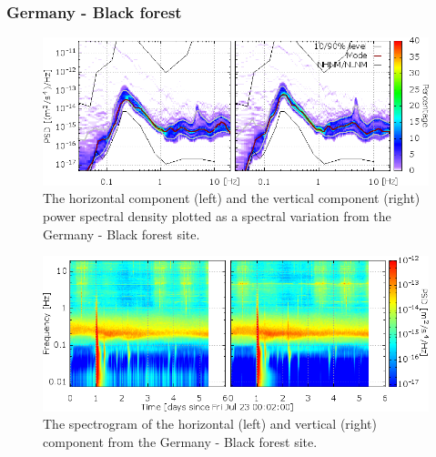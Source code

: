 \subsubsection*{Germany - Black forest}
\begin{figure}[h]
\centering
\includegraphics[width=\textwidth]{./Sec_SiteInfra/Figures/results/ZWald-A_multiplot1}
\caption{The horizontal component (left) and the vertical component (right) power spectral density plotted as a spectral variation from the Germany - Black forest site.}
\label{fig:ZWald-A_multiplot1}
\end{figure}\begin{figure}[h]
\centering
\includegraphics[width=\textwidth]{./Sec_SiteInfra/Figures/results/ZWald-A_multiplot2}
\caption{The spectrogram of the horizontal (left) and vertical (right) component from the Germany - Black forest site.}
\label{fig:ZWald-A_multiplot2}
\end{figure}

\pagebreak
\FloatBarrier
